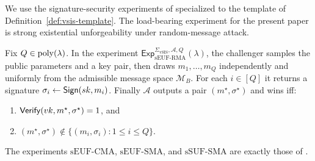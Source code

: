 \begin{definition}\label{def:vsis-games}
We use the signature-security experiments of \cite[Definition~4 and Figure~3]{EPRINT:DKLW25} specialized to the
template of Definition~\ref{def:vsis-template}. The load-bearing experiment for the present paper is strong
existential unforgeability under random-message attack.

Fix \(Q\in\mathrm{poly}(\lambda)\). In the experiment
\(\mathsf{Exp}_{\mathrm{sEUF\mbox{-}RMA}}^{\Sigma_{\mathrm{vSIS}},\mathcal A,Q}(\lambda)\), the challenger samples the
public parameters and a key pair, then draws \(m_1,\ldots,m_Q\) independently and uniformly from the admissible message
space \(\mathcal{M}_B\). For each \(i\in[Q]\) it returns a signature \(\sigma_i\leftarrow \mathsf{Sign}(sk,m_i)\). Finally
\(\mathcal A\) outputs a pair \((m^\star,\sigma^\star)\) and wins iff:
\begin{enumerate}[leftmargin=1.25em]
    \item \(\mathsf{Verify}(vk,m^\star,\sigma^\star)=1\), and
    \item \((m^\star,\sigma^\star)\notin \{(m_i,\sigma_i):1\le i\le Q\}\).
\end{enumerate}
The experiments \(\mathrm{sEUF\mbox{-}CMA}\), \(\mathrm{sEUF\mbox{-}SMA}\), and \(\mathrm{sSUF\mbox{-}SMA}\) are exactly
those of \cite[Figure~3]{EPRINT:DKLW25}.
\end{definition}

